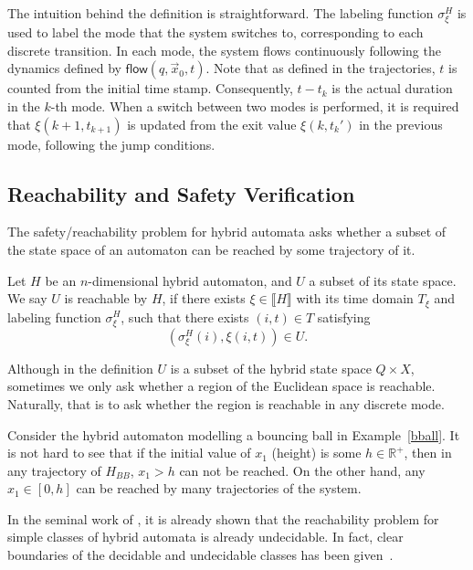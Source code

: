 \documentclass[envcountsect]{llncs}
\newcommand{\flow}{\mathsf{flow}}
\begin{document}
The intuition behind the definition is straightforward. The labeling function $\sigma_{\xi}^H$ is used to label the mode that the system switches to, corresponding to each discrete transition. In each mode, the system flows continuously following the dynamics defined by $\flow(q, \vec x_0, t)$. Note that as defined in the trajectories, $t$ is counted from the initial time stamp. Consequently, $t-t_k$ is the actual duration in the $k$-th mode. When a switch between  two modes is performed, it is required that $\xi(k+1, t_{k+1})$ is updated from the exit value $\xi(k, t_k')$ in the previous mode, following the jump conditions.

\subsection{Reachability and Safety Verification}

The safety/reachability problem for hybrid automata asks whether a subset of the state space of an automaton can be reached by some trajectory of it. 
\begin{definition}[Reachability]\label{reachability}
Let $H$ be an $n$-dimensional hybrid automaton, and $U$ a subset of its state space. We say $U$ is reachable by $H$, if there exists $\xi\in\llbracket H \rrbracket$ with its time domain $T_{\mathcal{\xi}}$ and labeling function $\sigma_{\xi}^H$, such that there exists $(i,t)\in T$ satisfying
$$(\sigma^H_{\xi}(i), \xi(i,t))\in U.$$
\end{definition}

\begin{remark}
Although in the definition $U$ is a subset of the hybrid state space $Q\times X$, sometimes we only ask whether a region of the Euclidean space is reachable. Naturally, that is to ask whether the region is reachable in any discrete mode. 
\end{remark}

\begin{example}
Consider the hybrid automaton modelling a bouncing ball in Example~\ref{bball}. It is not hard to see that if the initial value of $x_1$ (height) is some $h\in \mathbb{R}^+$, then in any trajectory of $H_{BB}$, $x_1> h$ can not be reached. On the other hand, any $x_1\in [0, h]$ can be reached by many trajectories of the system. 
\end{example}

In the seminal work of \cite{DBLP:conf/rex/AlurD91,DBLP:conf/hybrid/AlurCHH92}, it is already shown that the reachability problem for simple classes of hybrid automata is already undecidable. In fact, clear boundaries of the decidable and undecidable classes has been given~\cite{DBLP:journals/jcss/HenzingerKPV98}.
\end{document}
